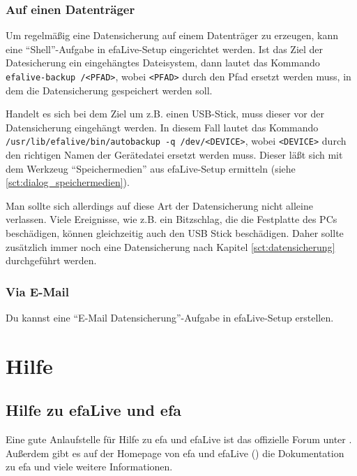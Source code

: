 \documentclass[a4paper,12pt,twoside]{article}
\begin{document}
\subsubsection{Auf einen Datenträger}
\label{sct:cont_device}
Um regelmäßig eine Datensicherung auf einem Datenträger zu erzeugen, 
kann eine "`Shell"'-Aufgabe in efaLive-Setup eingerichtet werden. Ist 
das Ziel der Datesicherung ein eingehängtes Dateisystem, dann lautet 
das Kommando \texttt{efalive-backup /{\textless}PFAD{\textgreater}}, wobei 
\texttt{{\textless}PFAD{\textgreater}} durch den Pfad ersetzt werden muss, in dem die 
Datensicherung gespeichert werden soll.

Handelt es sich bei dem Ziel um z.B. einen USB-Stick, muss dieser vor
der Datensicherung eingehängt werden. In diesem Fall lautet das Kommando \\
\texttt{/usr/lib/efalive/bin/autobackup -q /dev/{\textless}DEVICE{\textgreater}}, wobei 
\texttt{{\textless}DEVICE{\textgreater}} durch den richtigen Namen der Gerätedatei ersetzt werden 
muss. Dieser läßt sich mit dem Werkzeug "`Speichermedien"' aus efaLive-Setup ermitteln 
(siehe \ref{sct:dialog_speichermedien}).

Man sollte sich allerdings auf diese Art der Datensicherung nicht
alleine verlassen. Viele Ereignisse, wie z.B. ein Bitzschlag, die die
Festplatte des PCs beschädigen, können gleichzeitig auch den USB Stick
beschädigen. Daher sollte zusätzlich immer noch eine Datensicherung
nach Kapitel \ref{sct:datensicherung} durchgeführt werden.


\subsubsection{Via E-Mail}
\label{cont_mail}
Du kannst eine "`E-Mail Datensicherung"'-Aufgabe in efaLive-Setup erstellen.


\section{Hilfe}
\label{sct:hilfe}
\subsection{Hilfe zu efaLive und efa}
\label{sct:hilfe_efa}
Eine gute Anlaufstelle für Hilfe zu efa und efaLive ist das offizielle
Forum unter \cite{EFA3}. Außerdem gibt es auf der Homepage von efa und
efaLive (\cite{EFA1}\cite{EFA4}\cite{EFA5}) die Dokumentation zu efa
und viele weitere Informationen.
\end{document}
